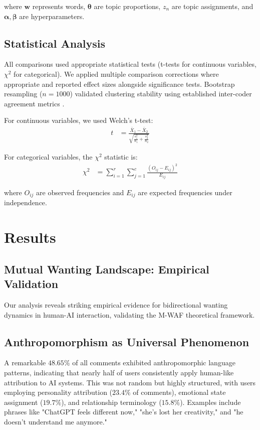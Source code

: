 \documentclass{article}
\begin{document}
where $\mathbf{w}$ represents words, $\boldsymbol{\theta}$ are topic proportions, $z_n$ are topic assignments, and $\boldsymbol{\alpha}, \boldsymbol{\beta}$ are hyperparameters.

\subsection{Statistical Analysis}

All comparisons used appropriate statistical tests (t-tests for continuous variables, $\chi^2$ for categorical). We applied multiple comparison corrections where appropriate and reported effect sizes alongside significance tests. Bootstrap resampling ($n=1000$) validated clustering stability using established inter-coder agreement metrics \citep{landis1977measurement}.

For continuous variables, we used Welch's t-test:
\begin{align}
t &= \frac{\bar{X}_1 - \bar{X}_2}{\sqrt{\frac{s_1^2}{n_1} + \frac{s_2^2}{n_2}}} \label{eq:ttest}
\end{align}

For categorical variables, the $\chi^2$ statistic is:
\begin{align}
\chi^2 &= \sum_{i=1}^{r} \sum_{j=1}^{c} \frac{(O_{ij} - E_{ij})^2}{E_{ij}} \label{eq:chisquare}
\end{align}

where $O_{ij}$ are observed frequencies and $E_{ij}$ are expected frequencies under independence.

\section{Results}

\subsection{Mutual Wanting Landscape: Empirical Validation}

Our analysis reveals striking empirical evidence for bidirectional wanting dynamics in human-AI interaction, validating the M-WAF theoretical framework.

\subsection{Anthropomorphism as Universal Phenomenon}

A remarkable $48.65\%$ of all comments exhibited anthropomorphic language patterns, indicating that nearly half of users consistently apply human-like attribution to AI systems. This was not random but highly structured, with users employing personality attribution ($23.4\%$ of comments), emotional state assignment ($19.7\%$), and relationship terminology ($15.8\%$). Examples include phrases like "ChatGPT feels different now," "she's lost her creativity," and "he doesn't understand me anymore."
\end{document}
